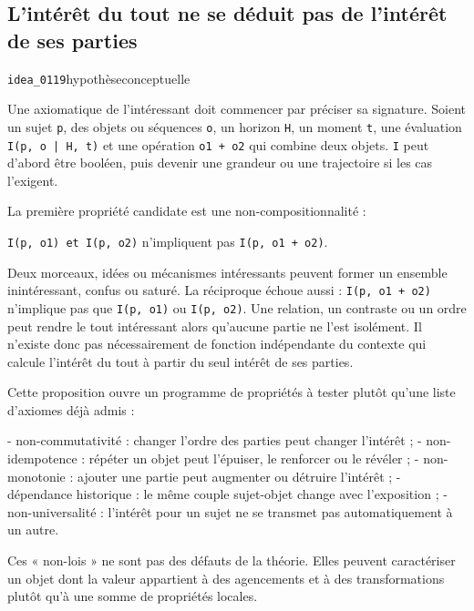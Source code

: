 \documentclass[10pt,a4paper]{article}
\begin{document}
\subsection{L'intérêt du tout ne se déduit pas de l'intérêt de ses parties}
{\small\color{metadata} \texttt{idea\_0119}\quad\textbullet\quad hypothèse\quad\textbullet\quad conceptuelle\par}

Une axiomatique de l'intéressant doit commencer par préciser sa signature. Soient un sujet \texttt{p}, des objets ou séquences \texttt{o}, un horizon \texttt{H}, un moment \texttt{t}, une évaluation \texttt{I(p, o | H, t)} et une opération \texttt{o1 + o2} qui combine deux objets. \texttt{I} peut d'abord être booléen, puis devenir une grandeur ou une trajectoire si les cas l'exigent.

La première propriété candidate est une non-compositionnalité :

\texttt{I(p, o1) et I(p, o2)} n'impliquent pas \texttt{I(p, o1 + o2)}.

Deux morceaux, idées ou mécanismes intéressants peuvent former un ensemble inintéressant, confus ou saturé. La réciproque échoue aussi : \texttt{I(p, o1 + o2)} n'implique pas que \texttt{I(p, o1)} ou \texttt{I(p, o2)}. Une relation, un contraste ou un ordre peut rendre le tout intéressant alors qu'aucune partie ne l'est isolément. Il n'existe donc pas nécessairement de fonction indépendante du contexte qui calcule l'intérêt du tout à partir du seul intérêt de ses parties.

Cette proposition ouvre un programme de propriétés à tester plutôt qu'une liste d'axiomes déjà admis :

- non-commutativité : changer l'ordre des parties peut changer l'intérêt ; - non-idempotence : répéter un objet peut l'épuiser, le renforcer ou le révéler ; - non-monotonie : ajouter une partie peut augmenter ou détruire l'intérêt ; - dépendance historique : le même couple sujet-objet change avec l'exposition ; - non-universalité : l'intérêt pour un sujet ne se transmet pas automatiquement à un autre.

Ces « non-lois » ne sont pas des défauts de la théorie. Elles peuvent caractériser un objet dont la valeur appartient à des agencements et à des transformations plutôt qu'à une somme de propriétés locales.
\end{document}
